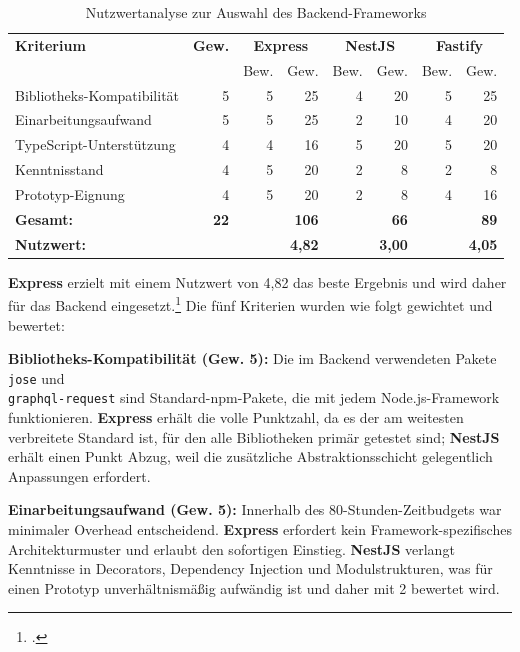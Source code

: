 \documentclass[11pt, a4paper, oneside]{report}
\begin{document}
\begin{table}[H]
  \centering
  \caption{Nutzwertanalyse zur Auswahl des Backend-Frameworks}
  \label{tab:nutzwert}
  \begin{tabularx}{\textwidth}{l r r r r r r r}
    \toprule
    \textbf{Kriterium} & \textbf{Gew.} &
    \multicolumn{2}{c}{\textbf{Express}} &
    \multicolumn{2}{c}{\textbf{NestJS}} &
    \multicolumn{2}{c}{\textbf{Fastify}} \\
    & & Bew. & Gew. & Bew. & Gew. & Bew. & Gew. \\
    \midrule
    Bibliotheks-Kompatibilität & 5 & 5 & 25 & 4 & 20 & 5 & 25 \\
    Einarbeitungsaufwand       & 5 & 5 & 25 & 2 & 10 & 4 & 20 \\
    TypeScript-Unterstützung   & 4 & 4 & 16 & 5 & 20 & 5 & 20 \\
    Kenntnisstand              & 4 & 5 & 20 & 2 &  8 & 2 &  8 \\
    Prototyp-Eignung           & 4 & 5 & 20 & 2 &  8 & 4 & 16 \\
    \midrule
    \textbf{Gesamt:} & \textbf{22} & & \textbf{106} & & \textbf{66} & & \textbf{89} \\
    \textbf{Nutzwert:} & & & \textbf{4,82} & & \textbf{3,00} & & \textbf{4,05} \\
    \bottomrule
  \end{tabularx}
\end{table}

\textbf{Express} erzielt mit einem Nutzwert von 4{,}82 das beste Ergebnis und wird daher
für das Backend eingesetzt.\footcite{express_docs} Die fünf Kriterien wurden wie folgt gewichtet und
bewertet:

\textbf{Bibliotheks-Kompatibilität (Gew. 5):} Die im Backend verwendeten Pakete
\texttt{jose} und \\\texttt{graphql-request} sind Standard-npm-Pakete, die mit
jedem Node.js-Framework funktionieren. \textbf{Express} erhält die volle Punktzahl, da
es der am weitesten verbreitete Standard ist, für den alle Bibliotheken primär
getestet sind; \textbf{NestJS} erhält einen Punkt Abzug, weil die zusätzliche
Abstraktionsschicht gelegentlich Anpassungen erfordert.

\textbf{Einarbeitungsaufwand (Gew. 5):} Innerhalb des 80-Stunden-Zeitbudgets
war minimaler Overhead entscheidend. \textbf{Express} erfordert kein
Framework-spezifisches Architekturmuster und erlaubt den sofortigen Einstieg.
\textbf{NestJS} verlangt Kenntnisse in Decorators, Dependency Injection und
Modulstrukturen, was für einen Prototyp unverhältnismäßig aufwändig ist und
daher mit 2 bewertet wird.
\end{document}
